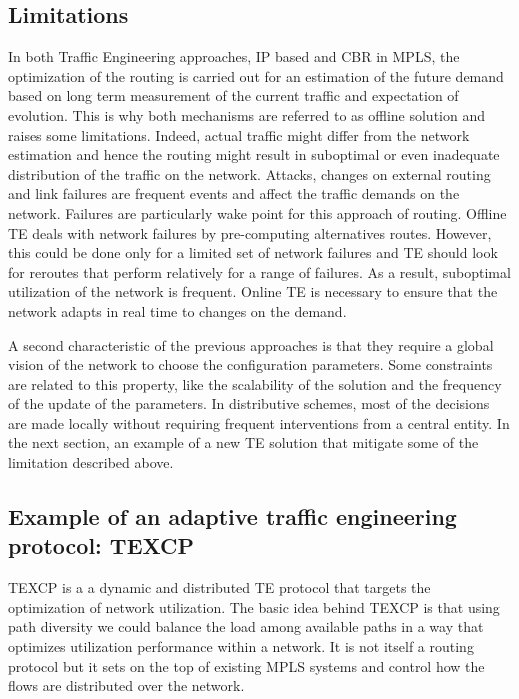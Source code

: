 \subsection{Limitations}
	In both Traffic Engineering approaches, IP based and CBR in MPLS, the optimization of the routing is carried out for an estimation of the future demand based on long term measurement of the current traffic and expectation of evolution.  This is why both mechanisms are referred to as offline solution and raises some limitations. Indeed, actual traffic might differ from the network estimation and hence the routing might result in suboptimal or even inadequate distribution of the traffic on the network. Attacks, changes on external routing and link failures are frequent events and affect the traffic demands on the network. Failures are particularly wake point for this approach of routing. Offline TE deals with network failures by pre-computing alternatives routes. However, this could be done only for a limited set of network failures and TE should look for reroutes that perform relatively for a range of failures. As a result, suboptimal utilization of the network is frequent. Online TE is necessary to ensure that the network adapts in real time to changes on the demand.
	
A second characteristic of the previous approaches is that they require a global vision of the network to choose the configuration parameters. Some constraints are related to this property, like the scalability of the solution and the frequency of the update of the parameters. In distributive schemes, most of the decisions are made locally without requiring frequent interventions from a  central entity. 
In the next section, an example of a new TE solution that mitigate some of the limitation described above.

\subsection{Example of an adaptive traffic engineering protocol: TEXCP }

TEXCP is a a dynamic and distributed TE protocol that targets the optimization of network utilization. The basic idea behind TEXCP is that using path diversity we could balance the load among available paths in a way that optimizes utilization performance within a network. It is not itself a routing protocol but it sets on the top of existing MPLS systems and control how the flows are distributed over the network.

